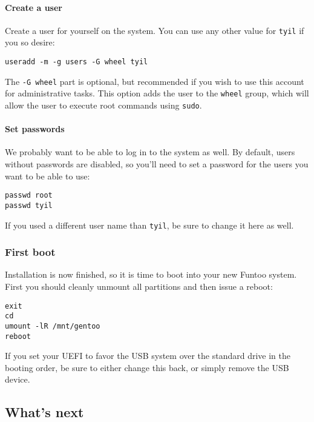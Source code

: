 \paragraph{Create a user}\label{create-a-user}

Create a user for yourself on the system. You can use any other value
for \texttt{tyil} if you so desire:

\begin{verbatim}
useradd -m -g users -G wheel tyil
\end{verbatim}

The \texttt{-G\ wheel} part is optional, but recommended if you wish to
use this account for administrative tasks. This option adds the user to
the \texttt{wheel} group, which will allow the user to execute root
commands using \texttt{sudo}.

\paragraph{Set passwords}\label{set-passwords}

We probably want to be able to log in to the system as well. By default,
users without passwords are disabled, so you'll need to set a password
for the users you want to be able to use:

\begin{verbatim}
passwd root
passwd tyil
\end{verbatim}

If you used a different user name than \texttt{tyil}, be sure to change
it here as well.

\subsubsection{First boot}\label{first-boot}

Installation is now finished, so it is time to boot into your new Funtoo
system. First you should cleanly unmount all partitions and then issue a
reboot:

\begin{verbatim}
exit
cd
umount -lR /mnt/gentoo
reboot
\end{verbatim}

If you set your UEFI to favor the USB system over the standard drive in
the booting order, be sure to either change this back, or simply remove
the USB device.

\subsection{What's next}\label{whats-next}

